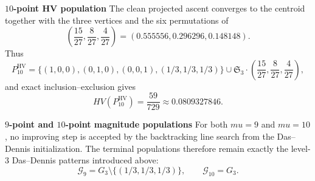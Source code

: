 \documentclass{article}
\def\mu{mu}%
\def\HV{HV}%
\theoremstyle{definition}
\newcommand{\HV}{\operatorname{HV}}
\newcommand{\1}{\mathbf{1}}
\newcommand{\myparagraph}[1]{\medskip\noindent\textbf{#1}}
\begin{document}
\myparagraph{$10$-point HV population}
The clean projected ascent converges to the centroid together with the three vertices and the six permutations of
\[
\left(\frac{15}{27},\frac{8}{27},\frac{4}{27}\right)
=
(0.555556,0.296296,0.148148).
\]
Thus
\[
P^{\mathrm{HV}}_{10}
=
\{(1,0,0),(0,1,0),(0,0,1),(1/3,1/3,1/3)\}
\cup
\mathfrak S_3\cdot\left(\frac{15}{27},\frac{8}{27},\frac{4}{27}\right),
\]
and exact inclusion--exclusion gives
\[
\HV(P^{\mathrm{HV}}_{10})=\frac{59}{729}\approx 0.0809327846.
\]

\myparagraph{$9$-point and $10$-point magnitude populations}
For both $\mu=9$ and $\mu=10$, no improving step is accepted by the backtracking line search from the Das--Dennis initialization. The terminal populations therefore remain exactly the level-$3$ Das--Dennis patterns introduced above:
\[
\mathcal G_9=G_3\setminus\{(1/3,1/3,1/3)\},
\qquad
\mathcal G_{10}=G_3.
\]
\end{document}
